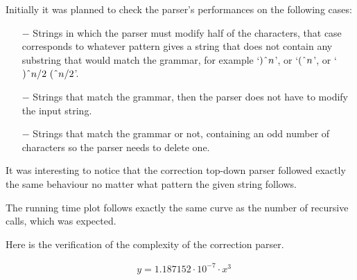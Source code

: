 Initially it was planned to check the parser's performances on the following cases:

\begin{itemize}
    \item[$-$] Strings in which the parser must modify half of the characters, that case corresponds to whatever pattern gives a string that does not contain any substring that would match the grammar, for example `$)\string^ n$', or `$(\string^ n$', or `$)\string^ n / 2 \text{ } (\string^ n / 2$'.
    \item[$-$] Strings that match the grammar, then the parser does not have to modify the input string.
    \item[$-$] Strings that match the grammar or not, containing an odd number of characters so the parser needs to delete one.
\end{itemize}

It was interesting to notice that the correction top-down parser followed exactly the same behaviour no matter what pattern the given string follows.

\FloatBarrier
\begin{figure}[h]
\end{figure}
\FloatBarrier

The running time plot follows exactly the same curve as the number of recursive calls, which was expected.

Here is the verification of the complexity of the correction parser.

\begin{align*}
    &y = 1.187152 \cdot 10^{-7} \cdot x^3
\end{align*}


